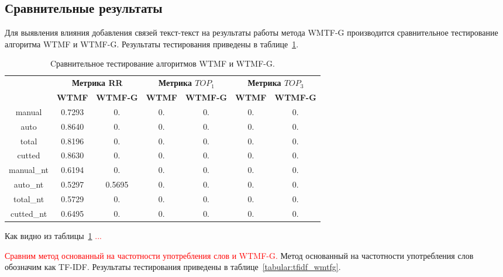 \subsection{Сравнительные результаты}
    Для выявления влияния добавления связей текст-текст на результаты работы метода WMTF-G производится сравнительное тестирование алгоритма WTMF и WTMF-G.
    Результаты тестирования приведены в таблице~\ref{tabular:wtmf_wmtfg}.

    \begin{table}[h!]
    \caption{Cравнительное тестирование алгоритмов WTMF и WTMF-G. \bigskip}
    \centering

    \label{tabular:wtmf_wmtfg}
        \begin{tabular}{|c|c|c|c|c|c|c|}
            \hline
            \bf{\multirow{2}{*}{\specialcell{Набор данных}}} &
            \multicolumn{2}{|c|}{\bf{Метрика RR}} &
            \multicolumn{2}{|c|}{\bf{Метрика $TOP_1$}} &
            \multicolumn{2}{|c|}{\bf{Метрика $TOP_3$}} \\ \cline{2-7}
            & \bf{WTMF} & \bf{WTMF-G} & \bf{WTMF} & \bf{WTMF-G} & \bf{WTMF} & \bf{WTMF-G} \\ \hline
            manual & 0.7293 & 0. & 0. & 0. & 0. & 0. \\ \hline
            auto & 0.8640 & 0. & 0. & 0. & 0. & 0. \\ \hline
            total & 0.8196 & 0. & 0. & 0. & 0. & 0. \\ \hline
            cutted & 0.8630 & 0. & 0. & 0. & 0. & 0. \\ \hline
            manual\_nt & 0.6194 & 0. & 0. & 0. & 0. & 0. \\ \hline
            auto\_nt & 0.5297 & 0.5695 & 0. & 0. & 0. & 0. \\ \hline
            total\_nt & 0.5729 & 0. & 0. & 0. & 0. & 0. \\ \hline
            cutted\_nt & 0.6495 & 0. & 0. & 0. & 0. & 0. \\ \hline
        \end{tabular}
    \end{table}
    Как видно из таблицы~\ref{tabular:wtmf_wmtfg} \textcolor{red}{...}

    \textcolor{red}{Сравним метод основанный на частотности употребления слов и WTMF-G.}
    Метод основанный на частотности употребления слов обозначим как TF-IDF.
    Результаты тестирования приведены в таблице~\ref{tabular:tfidf_wmtfg}.

